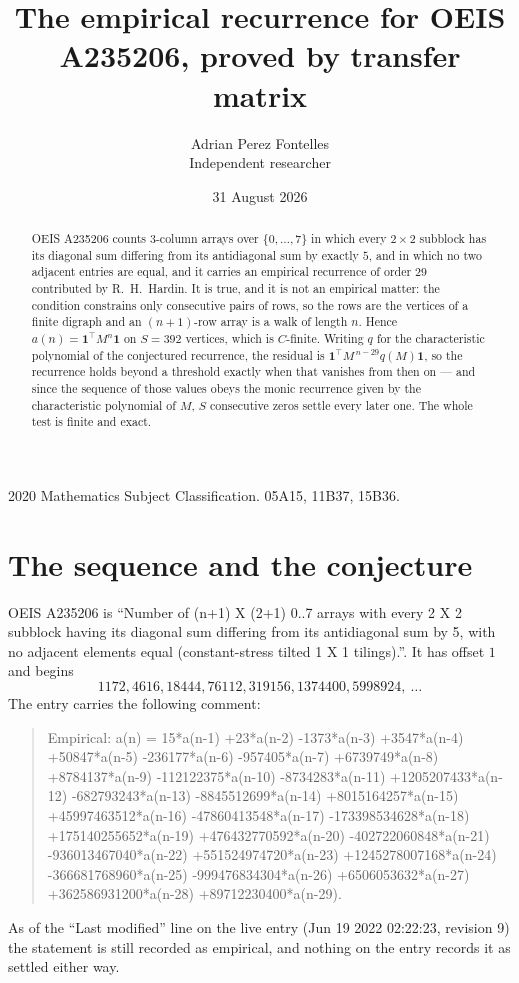 \documentclass[11pt,a4paper]{article}
\title{The empirical recurrence for OEIS A235206, proved by transfer matrix}
\author{Adrian Perez Fontelles\\ \small Independent researcher}
\date{31 August 2026}
\theoremstyle{plain}
\theoremstyle{definition}
\begin{document}
\maketitle

\begin{abstract}
OEIS A235206 counts $3$-column arrays over $\{0,\dots,7\}$ in which every
$2\times2$ subblock has its diagonal sum differing from its antidiagonal sum by
exactly $5$, and in which no two adjacent entries are equal, and it
carries an empirical recurrence of order $29$ contributed by R.~H.~Hardin. It is true,
and it is not an empirical matter: the condition constrains only consecutive pairs of rows,
so the rows are the vertices of a finite digraph and an $(n+1)$-row array is a walk of
length $n$. Hence $a(n)=\mathbf{1}^{\!\top}M^{n}\mathbf{1}$ on $S=392$ vertices, which
is $C$-finite. Writing $q$ for the characteristic polynomial of the conjectured recurrence,
the residual is $\mathbf{1}^{\!\top}M^{\,n-29}q(M)\mathbf{1}$, so the recurrence
holds beyond a threshold exactly when that vanishes from then on --- and since the sequence
of those values obeys the monic recurrence given by the characteristic polynomial of $M$,
$S$ consecutive zeros settle every later one. The whole test is finite and exact.
\end{abstract}

\noindent\small 2020 Mathematics Subject Classification. 05A15, 11B37, 15B36.\normalsize

\section{The sequence and the conjecture}

OEIS A235206 is ``Number of (n+1) X (2+1) 0..7 arrays with every 2 X 2 subblock having its diagonal sum differing from its antidiagonal sum by 5, with no adjacent elements equal (constant-stress tilted 1 X 1 tilings).''. It has offset
$1$ and begins
\[
1172, 4616, 18444, 76112, 319156, 1374400, 5998924,\ \dots
\]
The entry carries the following comment:
\begin{quote}\small
Empirical: a(n) = 15*a(n-1) +23*a(n-2) -1373*a(n-3) +3547*a(n-4) +50847*a(n-5) -236177*a(n-6) -957405*a(n-7) +6739749*a(n-8) +8784137*a(n-9) -112122375*a(n-10) -8734283*a(n-11) +1205207433*a(n-12) -682793243*a(n-13) -8845512699*a(n-14) +8015164257*a(n-15) +45997463512*a(n-16) -47860413548*a(n-17) -173398534628*a(n-18) +175140255652*a(n-19) +476432770592*a(n-20) -402722060848*a(n-21) -936013467040*a(n-22) +551524974720*a(n-23) +1245278007168*a(n-24) -366681768960*a(n-25) -999476834304*a(n-26) +6506053632*a(n-27) +362586931200*a(n-28) +89712230400*a(n-29).
\end{quote}
As of the ``Last modified'' line on the live entry (Jun 19 2022 02:22:23, revision 9) the statement is
still recorded as empirical, and nothing on the entry records it as settled either way.
\end{document}
